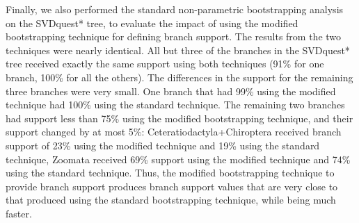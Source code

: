 Finally, we also performed the standard non-parametric bootstrapping analysis on
the SVDquest* tree, to evaluate the impact of using the modified bootstrapping technique for defining branch support.
The results from the two techniques were nearly identical. 
All but three of the branches in the SVDquest* tree received exactly the same
support using both techniques (91\% for one branch, 100\% for all the others). 
The differences in the support for the remaining three branches were very small.
One branch that had  99\% using the modified technique had 100\% using the
standard technique.
The  remaining two branches had support less than 75\% using the modified 
bootstrapping technique, and their support changed by at most 5\%: 
Ceteratiodactyla+Chiroptera received  branch support of 23\% using the modified
technique and 19\% using the standard technique, 
Zoomata received 69\% support using the modified technique and 74\% using 
the standard technique. 
Thus, the  modified bootstrapping technique to provide branch support
produces branch support values that are very close to that produced using
the standard bootstrapping technique, while being much faster.



